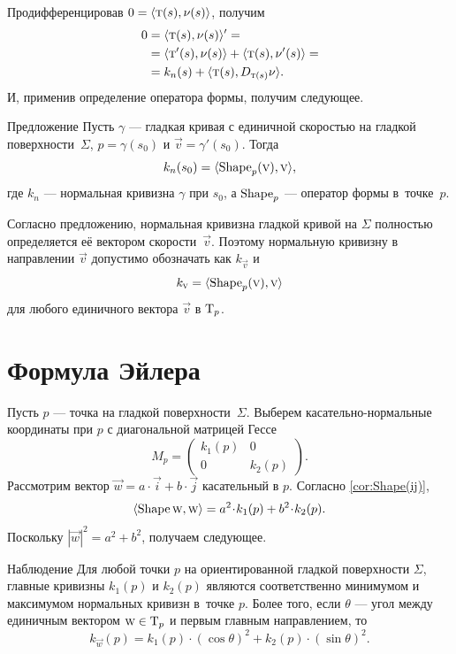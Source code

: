 Продифференцировав $0=\langle \text{\sc{t}}(s),\nu(s)\rangle$, получим
\begin{align*}
0&=\langle \text{\sc{t}}(s),\nu(s)\rangle'=
\\
&=\langle \text{\sc{t}}'(s),\nu(s)\rangle+\langle \text{\sc{t}}(s),\nu'(s)\rangle=
\\
&=k_n(s)+\langle \text{\sc{t}}(s),D_{\text{\sc{t}}(s)}\nu\rangle.
\end{align*}
И, применив определение оператора формы,
получим следующее.

\begin{thm}{Предложение}\label{prop:normal-shape}
Пусть $\gamma$ --- гладкая кривая с единичной скоростью на гладкой поверхности~$\Sigma$, $p=\gamma(s_0)$ и $\vec v=\gamma'(s_0)$.
Тогда 
\[k_n(s_0)=\langle \mathop{\rm Shape}\nolimits_p(\text{\sc{v}}),\text{\sc{v}}\rangle,\]
где $k_n$ --- нормальная кривизна $\gamma$ при $s_0$, а $\mathop{\rm Shape}\nolimits_p$ --- оператор формы в~точке~$p$.
\end{thm}

Согласно предложению, нормальная кривизна гладкой кривой на $\Sigma$ полностью определяется её вектором скорости~$\vec v$.
Поэтому нормальную кривизну в направлении $\vec v$ допустимо обозначать как $k_{\vec v}$ и
\[k_{\text{\sc{v}}}=\langle \mathop{\rm Shape}\nolimits_p(\text{\sc{v}}),\text{\sc{v}}\rangle\]
для любого единичного вектора $\vec v$ в $\mathrm{T}_p$.


\section{Формула Эйлера}

Пусть $p$ --- точка на гладкой поверхности~$\Sigma$.
Выберем касательно-нормальные координаты при $p$ с диагональной матрицей Гессе
\[M_p=\begin{pmatrix}
 k_1(p)
 &0
 \\
 0
 &k_2(p)
 \end{pmatrix}.
\]
Рассмотрим вектор ${\vec w}=a\cdot\vec i+b\cdot\vec j$ касательный в $p$.
Согласно \ref{cor:Shape(ij)},
\[
\langle \Shape\vec w,\vec w\rangle
=a^2\cdot k_1(p) +b^2\cdot k_2(p). 
\]
Поскольку $|{\vec w}|^2=a^2+b^2$, получаем следующее.

\begin{thm}{Наблюдение}\label{obs:k1-k2}
Для любой точки $p$ на ориентированной гладкой поверхности $\Sigma$,
главные кривизны $k_1(p)$ и $k_2(p)$ являются соответственно минимумом и максимумом нормальных кривизн в~точке $p$.
Более того, если $\theta$ --- угол между единичным вектором ${\text{\sc{w}}}\in\mathrm{T}_p$ и первым главным направлением, то 
\[k_{\vec w}(p)=k_1(p)\cdot(\cos\theta)^2+k_2(p)\cdot(\sin\theta)^2.\]

\end{thm}

